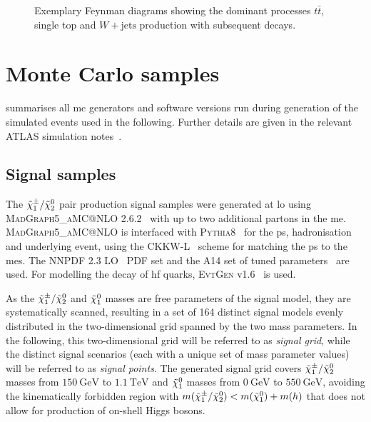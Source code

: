 \begin{figure}
\begin{subfigure}[b]{0.3\linewidth}
		\caption{\label{fig:wjets}}
	\end{subfigure}
	\caption{Exemplary Feynman diagrams showing the dominant processes  $t\bar{t}$,  single top and  $W+\textrm{jets}$ production with subsequent decays.}
	\label{fig:sm_backgrounds_feynman}
\end{figure}


\section{Monte Carlo samples}

 summarises all \gls{mc} generators and software versions run during generation of the simulated events used in the following. Further details are given in the relevant ATLAS simulation notes~\cite{ATL-PHYS-PUB-2018-009,ATL-PHYS-PUB-2016-005,ATL-PHYS-PUB-2017-006,ATL-PHYS-PUB-2017-005}.

\subsection{Signal samples}\label{sec:signal_samples}

The $\tilde{\chi}_1^\pm/\tilde{\chi}_2^0$ pair production signal samples were generated at \gls{lo} using \textsc{MadGraph5\_aMC@NLO} 2.6.2~\cite{MGaMCNLO:2014hca,Frederix:2012ps} with up to two additional partons in the \gls{me}. \textsc{MadGraph5\_aMC@NLO} is interfaced with \textsc{Pythia8}~\cite{Pythia8:2007gs} for the \gls{ps}, hadronisation and underlying event, using the CKKW-L~\cite{Lonnblad:2011xx} scheme for matching the \gls{ps} to the \glspl{me}. The NNPDF 2.3 LO~\cite{Ball:2012cx} \gls{PDF} set and the A14 set of tuned parameters~\cite{ATL-PHYS-PUB-2014-021} are used. For modelling the decay of \gls{hf} quarks, \textsc{EvtGen} v1.6~\cite{Lange:2001uf} is used. 

As the $\tilde{\chi}_1^\pm/\tilde{\chi}_2^0$ and $\tilde{\chi}_1^0$ masses are free parameters of the signal model, they are systematically scanned, resulting in a set of 164 distinct signal models evenly distributed in the two-dimensional grid spanned by the two mass parameters. In the following, this two-dimensional grid will be referred to as \textit{signal grid}, while the distinct signal scenarios (each with a unique set of mass parameter values) will be referred to as \textit{signal points}. The generated signal grid covers $\tilde{\chi}_1^\pm/\tilde{\chi}_2^0$ masses from $\SI{150}{\GeV}$ to $\SI{1.1}{\TeV}$ and $\tilde{\chi}_1^0$ masses from $\SI{0}{\GeV}$ to $\SI{550}{\GeV}$, avoiding the kinematically forbidden region with $m(\tilde{\chi}_1^\pm/\tilde{\chi}_2^0) < m(\tilde{\chi}_1^0) + m(h)$ that does not allow for production of on-shell Higgs bosons.

